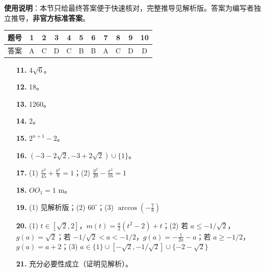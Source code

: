 
\begin{gknotice}
\textbf{使用说明}：本节只给最终答案便于快速核对，完整推导见解析版。答案为编写者独立推导，\textbf{非官方标准答案}。
\end{gknotice}

\begin{center}\begin{tabular}{ccccccccccc}
\toprule
题号 & 1 & 2 & 3 & 4 & 5 & 6 & 7 & 8 & 9 & 10 \\
\midrule
答案 & A & C & D & C & B & B & A & C & D & D \\
\bottomrule
\end{tabular}\end{center}

\begin{itemize}[leftmargin=2.6em]
  \item[\textbf{11.}] $4\sqrt6$。
  \item[\textbf{12.}] 18。
  \item[\textbf{13.}] 1260。
  \item[\textbf{14.}] 2。
  \item[\textbf{15.}] $2^{n+1}-2$。
  \item[\textbf{16.}] $(-3-2\sqrt2,-3+2\sqrt2)\cup\{1\}$。
\end{itemize}

\begin{itemize}[leftmargin=2.6em]
  \item[\textbf{17.}] (1) $\frac{x^2}{45}+\frac{y^2}{9}=1$；(2) $\frac{y^2}{20}-\frac{x^2}{16}=1$
  \item[\textbf{18.}] $OO_1=1$ m。
  \item[\textbf{19.}] (1) 见解析版；(2) $60^\circ$；(3) $\arccos(-\frac78)$
  \item[\textbf{20.}] (1) $t\in[\sqrt2,2]$，$m(t)=\frac a2(t^2-2)+t$；(2) 若 $a\le-1/\sqrt2$，$g(a)=\sqrt2$；若 $-1/\sqrt2<a<-1/2$，$g(a)=-\frac1{2a}-a$；若 $a\ge-1/2$，$g(a)=a+2$；(3) $a\in\{1\}\cup[-\sqrt2,-1/\sqrt2]\cup\{-2-\sqrt2\}$
  \item[\textbf{21.}] 充分必要性成立（证明见解析）。
\end{itemize}
